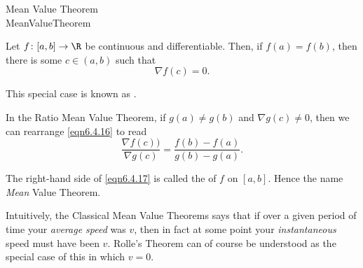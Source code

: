 \begin{thm}{Mean Value Theorem \\}{MeanValueTheorem}
\begin{rmk}
Let $f\colon [a,b]\rightarrow \R$ be continuous and differentiable.  Then, if $f(a)=f(b)$, then there is some $c\in (a,b)$ such that
\begin{equation}
\nabla f(c)=0.
\end{equation}

This special case is known as .
\end{rmk}
\begin{rmk}
In the Ratio Mean Value Theorem, if $g(a)\neq g(b)$ and $\nabla g(c)\neq 0$, then we can rearrange \eqref{eqn6.4.16} to read
\begin{equation}
\frac{\nabla f(c))}{\nabla g(c)}=\frac{f(b)-f(a)}{g(b)-g(a)}.
\end{equation}
\end{rmk}
\begin{rmk}
The right-hand side of \eqref{eqn6.4.17} is called the  of $f$ on $[a,b]$.  Hence the name \emph{Mean} Value Theorem.
\end{rmk}
\begin{rmk}
Intuitively, the Classical Mean Value Theorems says that if over a given period of time your \emph{average speed} was $v$, then in fact at some point your \emph{instantaneous} speed must have been $v$.  Rolle's Theorem can of course be understood as the special case of this in which $v=0$.


\end{rmk}
\end{thm}

